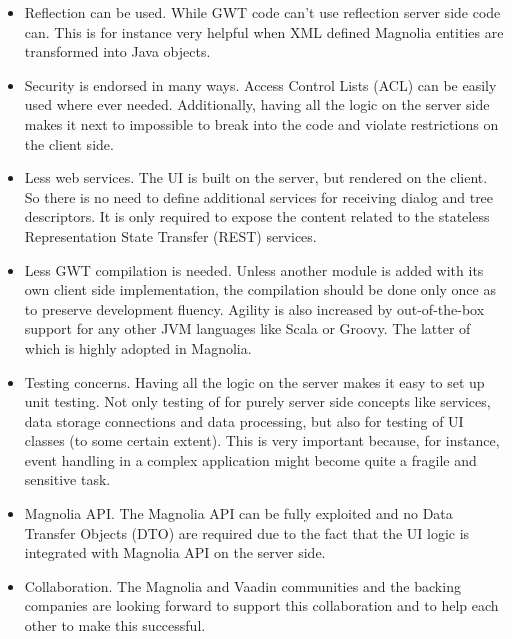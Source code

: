 \begin{itemize}
  \item Reflection can be used. While GWT code can't use reflection server side
  code can. This is for instance very helpful when 
  XML defined Magnolia entities are transformed into Java objects.

  \item Security is endorsed in many ways. Access Control Lists (ACL) can be
  easily used where ever needed. Additionally, having all the logic on the
  server side makes it next to impossible to break into the code and violate
  restrictions on the client side.

  \item Less web services. The UI is built on the server, but rendered on the
  client. So there is no need to define additional services for receiving dialog
  and tree descriptors. It is only required to expose the content related to the
  stateless Representation State Transfer (REST) services.

  \item Less GWT compilation is needed. Unless another module is added with its
  own client side implementation, the compilation should be done only once as to
  preserve development fluency. Agility is also increased by out-of-the-box
  support for any other JVM languages like Scala or Groovy. The latter of which
  is highly adopted in Magnolia.

  \item Testing concerns. Having all the logic on the server makes it easy to
  set up unit testing. Not only testing of for purely server side concepts like
  services, data storage connections and data processing, but also for testing
  of UI classes (to some certain extent). This is very important because, for
  instance, event handling in a complex application might become quite a fragile
  and sensitive task.
   
  \item Magnolia API. The Magnolia API can be fully exploited and no Data
  Transfer Objects (DTO) are required due to the fact that the UI logic is
  integrated with Magnolia API on the server side.

  \item Collaboration. The Magnolia and Vaadin communities and the backing
  companies are looking forward to support this collaboration and to help each
  other to make this successful.
  
\end{itemize}


